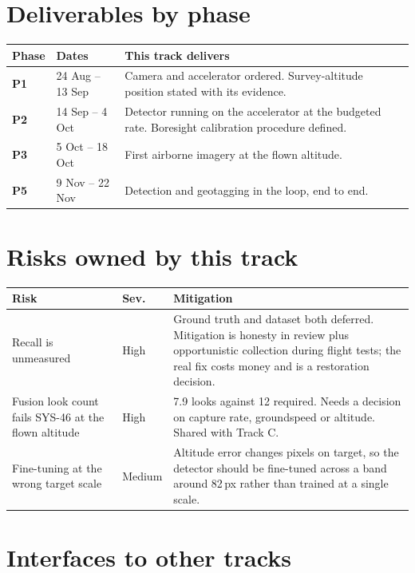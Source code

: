 \documentclass[11pt,a4paper]{article}
\begin{document}
\section{Deliverables by phase}

\begin{center}
\begin{tabular}{@{}llp{88mm}@{}}
\toprule
\textbf{Phase} & \textbf{Dates} & \textbf{This track delivers} \\
\midrule
\textbf{P1} & 24 Aug -- 13 Sep & Camera and accelerator ordered. Survey-altitude position stated with its evidence. \\
\textbf{P2} & 14 Sep -- 4 Oct & Detector running on the accelerator at the budgeted rate. Boresight calibration procedure defined. \\
\textbf{P3} & 5 Oct -- 18 Oct & First airborne imagery at the flown altitude. \\
\textbf{P5} & 9 Nov -- 22 Nov & Detection and geotagging in the loop, end to end. \\
\bottomrule
\end{tabular}
\end{center}

\section{Risks owned by this track}

\begin{center}
\begin{tabular}{@{}p{50mm}lp{70mm}@{}}
\toprule
\textbf{Risk} & \textbf{Sev.} & \textbf{Mitigation} \\
\midrule
Recall is unmeasured & High & Ground truth and dataset both deferred. Mitigation is honesty in review plus opportunistic collection during flight tests; the real fix costs money and is a restoration decision. \\
Fusion look count fails SYS-46 at the flown altitude & High & 7.9 looks against 12 required. Needs a decision on capture rate, groundspeed or altitude. Shared with Track C. \\
Fine-tuning at the wrong target scale & Medium & Altitude error changes pixels on target, so the detector should be fine-tuned across a band around 82\,px rather than trained at a single scale. \\
\bottomrule
\end{tabular}
\end{center}

\section{Interfaces to other tracks}
\end{document}
